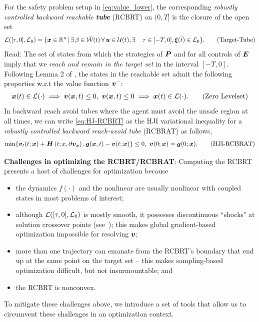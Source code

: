 For the safety problem setup in \eqref{eq:value_lower},  the corresponding \textit{robustly controlled backward reachable \textbf{tube}} (RCBRT) on $(0, T]$ %
is the closure of the open set~\citet{Mitchell2020}
%
\begin{align}
	\mathcal{L}([\tau, 0], \mathcal{L}_0) = \{\state \in \ren \,| \, \exists \, \beta \in \mathcal{\bar{W}}(t) \,  \forall \, \bm{u} \in \mathcal{U}(t), \exists \,
	   \quad  \tau \in [-T, 0], \bm{\xi}(\bar{t})%
	\in  \mathcal{L}_0 \}. %
	\tag{Target-Tube}
	\label{eq:rcbrt}
\end{align}
%
Read: The set of states from which the strategies of $\bm{P}$ and for all controls of $\bm{E}$ imply that we \textit{reach and remain in the target set} in the interval $[-T, 0]$.  Following Lemma 2 of \citet{Mitchell2005}, the states in the reachable set admit the following properties w.r.t the value function $\bm{v}^-$:
%
	\begin{align}
		\bm{x}(t)\in \mathcal{L}(\cdot) \implies \bm{v}(\bm{x}, t) \le 0, \,\,
		\bm{v}(\bm{x}, t) \le 0 \implies \bm{x}(t) \in \mathcal{L}(\cdot). 
		\tag{Zero Levelset}
		\label{eq:reachables} 
	\end{align}
%
In backward reach avoid tubes where the agent must avoid the unsafe region at all times, we can write \eqref{eq:HJ-RCBRT} as the HJI variational inequality for a \textit{robustly controlled backward reach-avoid tube} (RCBRAT) as follows,
%
\begin{align}
\min\{\bm{v}_t(t; \bm{x}) + \bm{H}\left(t; x, \partial \bm{v}_{\bm{x}}\right), \bm{g}(\bm{x}, t) - \bm{v}(t; \bm{x})\} \le 0,  \,\,
\bm{v}(0; \bm{x}) = \bm{g}(0; \bm{x}).
\tag{HJI-RCBRAT}
\label{eq:HJI-RCBRAT}
\end{align} 

\noindent \textbf{Challenges in optimizing the RCBRT/RCBRAT}: 
Computing the RCBRT presents a host of challenges for optimization because 
%
\begin{itemize}%
	\item the dynamics $f(\cdot)$ and the nonlinear \pde are usually nonlinear with coupled states in most problems of interest; 
	\item although  $\mathcal{L}([\tau, 0], \mathcal{L}_0)$ is mostly smooth, it possesses discontinuous ``shocks" at solution crossover points (see~\citet{Mitchell2020}); this makes global gradient-based optimization impossible for resolving $\bm{v}$;
	\item more than one trajectory can emanate from the RCBRT's boundary that end up at the same point on the target set -- this makes sampling-based optimization difficult, but not insurmountable; and
	\item the RCBRT is nonconvex.
\end{itemize}

To mitigate these challenges above, we introduce a set of tools that allow us to circumvent these challenges in an optimization context.

